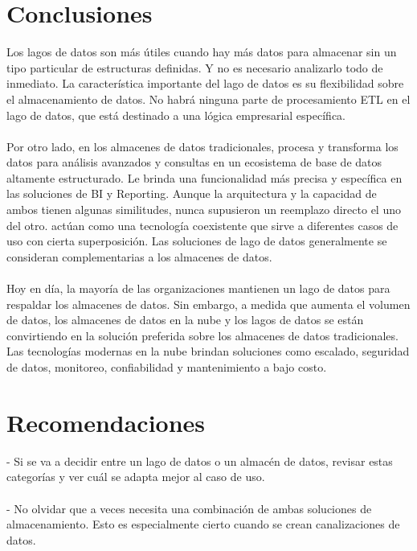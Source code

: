 \documentclass[11pt,twocolumn]{article}
\begin{document}
\section{Conclusiones}
Los lagos de datos son más útiles cuando hay más datos para almacenar sin un tipo particular de estructuras definidas. Y no es necesario analizarlo todo de inmediato. La característica importante del lago de datos es su flexibilidad sobre el almacenamiento de datos. No habrá ninguna parte de procesamiento ETL en el lago de datos, que está destinado a una lógica empresarial específica. 
\\\\Por otro lado, en los almacenes de datos tradicionales, procesa y transforma los datos para análisis avanzados y consultas en un ecosistema de base de datos altamente estructurado. Le brinda una funcionalidad más precisa y específica en las soluciones de BI y Reporting. Aunque la arquitectura y la capacidad de ambos tienen algunas similitudes, nunca supusieron un reemplazo directo el uno del otro. actúan como una tecnología coexistente que sirve a diferentes casos de uso con cierta superposición. Las soluciones de lago de datos generalmente se consideran complementarias a los almacenes de datos. 
\\\\Hoy en día, la mayoría de las organizaciones mantienen un lago de datos para respaldar los almacenes de datos. Sin embargo, a medida que aumenta el volumen de datos, los almacenes de datos en la nube y los lagos de datos se están convirtiendo en la solución preferida sobre los almacenes de datos tradicionales. Las tecnologías modernas en la nube brindan soluciones como escalado, seguridad de datos, monitoreo, confiabilidad y mantenimiento a bajo costo.



\section{Recomendaciones}
- Si se va a decidir entre un lago de datos o un almac\'en de datos, revisar estas categor\'ias y ver cu\'al se adapta mejor al caso de uso. 
\\\\
- No olvidar que a veces necesita una combinaci\'on de ambas soluciones de almacenamiento. Esto es especialmente cierto cuando se crean canalizaciones de datos.
\end{document}
